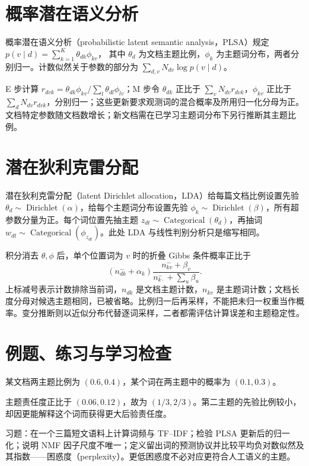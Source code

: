 \section{概率潜在语义分析}

概率潜在语义分析（probabilistic latent semantic analysis，PLSA）规定
$p(v\mid d)=\sum_{k=1}^K\theta_{dk}\phi_{kv}$，
其中 $\theta_d$ 为文档主题比例，$\phi_k$ 为主题词分布，两者分别归一。计数似然关于参数的部分为 $\sum_{d,v}N_{dv}\log p(v\mid d)$。

E 步计算 $r_{dvk}=\theta_{dk}\phi_{kv}/\sum_l\theta_{dl}\phi_{lv}$；M 步令 $\theta_{dk}$ 正比于 $\sum_vN_{dv}r_{dvk}$，$\phi_{kv}$ 正比于 $\sum_dN_{dv}r_{dvk}$，分别归一；这些更新要求观测词的混合概率及所用归一化分母为正。文档特定参数随文档数增长；新文档需在已学习主题词分布下另行推断其主题比例。

\section{潜在狄利克雷分配}

潜在狄利克雷分配（latent Dirichlet allocation，LDA）给每篇文档比例设置先验 $\theta_d\sim\operatorname{Dirichlet}(\alpha)$，给每个主题词分布设置先验 $\phi_k\sim\operatorname{Dirichlet}(\beta)$，所有超参数分量为正。每个词位置先抽主题 $z_{dt}\sim\operatorname{Categorical}(\theta_d)$，再抽词 $w_{dt}\sim\operatorname{Categorical}(\phi_{z_{dt}})$。此处 LDA 与线性判别分析只是缩写相同。

积分消去 $\theta,\phi$ 后，单个位置词为 $v$ 时的折叠 Gibbs 条件概率正比于
\[
 (n_{dk}^{-}+\alpha_k)
 \frac{n_{kv}^{-}+\beta_v}{n_{k\cdot}^{-}+\sum_u\beta_u}.
\]
上标减号表示计数排除当前词，$n_{dk}$ 是文档主题计数，$n_{kv}$ 是主题词计数；文档长度分母对候选主题相同，已被省略。比例归一后再采样，不能把未归一权重当作概率。变分推断则以近似分布代替逐词采样，二者都需评估计算误差和主题稳定性。

\section{例题、练习与学习检查}

\begin{example}[一次主题后验计算]
某文档两主题比例为 $(0.6,0.4)$，某个词在两主题中的概率为 $(0.1,0.3)$。
\end{example}
\begin{solve}
主题责任度正比于 $(0.06,0.12)$，故为 $(1/3,2/3)$。第二主题的先验比例较小，却因更能解释这个词而获得更大后验责任度。
\end{solve}

习题：在一个三篇短文语料上计算词频与 TF--IDF；检验 PLSA 更新后的归一化；说明 NMF 因子尺度不唯一；定义留出词的预测协议并比较平均负对数似然及其指数——困惑度（perplexity）。更低困惑度不必对应更符合人工语义的主题。





